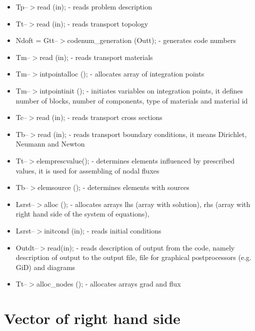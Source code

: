 \begin{itemize}
\item
Tp--$>$read (in); -  reads problem description

\item
Tt--$>$read (in); -  reads transport topology

\item
Ndoft = Gtt--$>$codenum\_generation (Outt); -  generates code numbers

\item
Tm--$>$read (in); - reads transport materials

\item
Tm--$>$intpointalloc (); - allocates array of integration points

\item
Tm--$>$intpointinit (); - initiates variables on integration points,
it defines number of blocks, number of components, type of materials and material id

\item
Tc--$>$read (in); - reads transport cross sections

\item
Tb--$>$read (in); - reads transport boundary conditions, it means
Dirichlet, Neumann and Newton

\item
Tt--$>$elemprescvalue(); - determines elements influenced by prescribed
values, it is used for assembling of nodal fluxes

\item
Tb--$>$elemsource (); - determines elements with sources

\item
Lsrst--$>$alloc (); - allocates arrays lhs (array with solution),
rhs (array with right hand side of the system of equations),

\item
Lsrst--$>$initcond (in); - reads initial conditions

\item
Outdt--$>$read(in); - reads description of output from the code, namely description
of output to the output file, file for graphical postprocessors (e.g. GiD) and
diagrams

\item
Tt--$>$alloc\_nodes (); - allocates arrays grad and flux

\end{itemize}


\section{Vector of right hand side}


